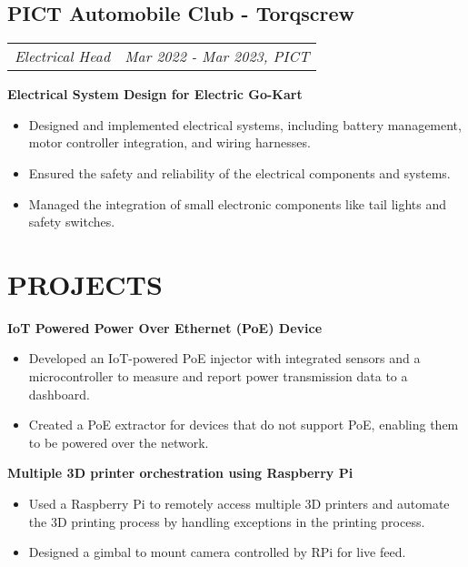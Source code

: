 \documentclass[10pt,a4paper,hidelinks,unicode]{moderncv}
\newcommand*{\experienceentry}[5][1.5mm]{
    \subsection{#2} \vspace{-1.5mm}
    \begin{tabularx}{\textwidth}{LR}
        {\itshape #3} & {\itshape #4, #5}
    \end{tabularx}
    \par\addvspace{#1}
}
\begin{document}
\begin{minipage}[t]{0.62\textwidth}
\experienceentry{PICT Automobile Club - Torqscrew}{Electrical Head}{Mar 2022 - Mar 2023}{PICT}

\textbf{Electrical System Design for Electric Go-Kart}
\begin{itemize}
    \item Designed and implemented electrical systems, including battery management, motor controller integration, and wiring harnesses.
    \item Ensured the safety and reliability of the electrical components and systems.
    \item Managed the integration of small electronic components like tail lights and safety switches.
\end{itemize}
\vspace{2.0mm}

\section{PROJECTS}

\textbf{IoT Powered Power Over Ethernet (PoE) Device}
\begin{itemize}
    \item Developed an IoT-powered PoE injector with integrated sensors and a microcontroller to measure and report power transmission data to a dashboard.
    \item Created a PoE extractor for devices that do not support PoE, enabling them to be powered over the network.
\end{itemize}
\vspace{2.0mm}
\textbf{Multiple 3D printer orchestration using Raspberry Pi}
\begin{itemize}
    \item Used a Raspberry Pi to remotely access multiple 3D printers and automate the 3D printing process by handling exceptions in the printing process.
    \item Designed a gimbal to mount camera controlled by RPi for live feed.
\end{itemize}
\vspace{2.0mm}


\end{minipage}
\hfill
\end{document}
